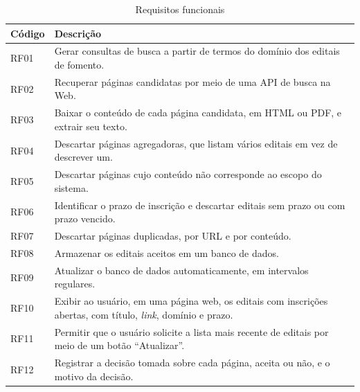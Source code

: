 \begin{table}[htbp]
\centering
\caption{Requisitos funcionais}
\label{tab:rf}
\small
\begin{tabularx}{\textwidth}{l X}
\toprule
Código & Descrição \\
\midrule
RF01 & Gerar consultas de busca a partir de termos do domínio dos editais de
       fomento. \\
RF02 & Recuperar páginas candidatas por meio de uma API de busca na Web. \\
RF03 & Baixar o conteúdo de cada página candidata, em HTML ou PDF, e extrair
       seu texto. \\
RF04 & Descartar páginas agregadoras, que listam vários editais em vez de
       descrever um. \\
RF05 & Descartar páginas cujo conteúdo não corresponde ao escopo do sistema. \\
RF06 & Identificar o prazo de inscrição e descartar editais sem prazo ou com
       prazo vencido. \\
RF07 & Descartar páginas duplicadas, por URL e por conteúdo. \\
RF08 & Armazenar os editais aceitos em um banco de dados. \\
RF09 & Atualizar o banco de dados automaticamente, em intervalos regulares. \\
RF10 & Exibir ao usuário, em uma página web, os editais com inscrições abertas,
       com título, \textit{link}, domínio e prazo. \\
RF11 & Permitir que o usuário solicite a lista mais recente de editais por meio
       de um botão ``Atualizar''. \\
RF12 & Registrar a decisão tomada sobre cada página, aceita ou não, e o motivo
       da decisão. \\
\bottomrule
\end{tabularx}
\end{table}

